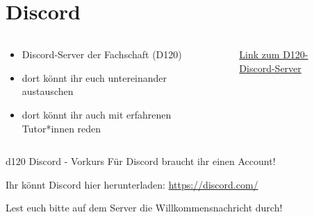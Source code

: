 \section{Discord}
\begin{frame}[c]
    \slidehead
    \begin{columns}[c]
        \begin{column}{.6\linewidth}
            \begin{itemize}
                \item Discord-Server der Fachschaft (D120)
                \item dort könnt ihr euch untereinander austauschen
                \item dort könnt ihr auch mit erfahrenen Tutor*innen reden
            \end{itemize}
        \end{column}%
        \begin{column}{.4\linewidth}
            \begin{figure}
                \centering\mbox{}
                \caption{\href{https://discord.gg/GBj9rvszDT}{Link zum D120-Discord-Server}}
            \end{figure}
        \end{column}
    \end{columns}
    \begin{block}{d120 Discord - Vorkurs}
        Für Discord braucht ihr einen Account!

        Ihr könnt Discord hier herunterladen: \url{https://discord.com/}

        Lest euch bitte auf dem Server die Willkommensnachricht durch!
    \end{block}
\end{frame}


